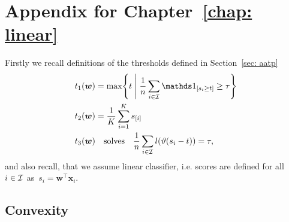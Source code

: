 \chapter{Appendix for Chapter~\ref{chap: linear}}

Firstly we recall definitions of the thresholds defined in Section~\ref{sec: aatp}
\begin{equation*}
  \begin{aligned}
    t_1(\bm{w}) & = \max \Set{t}{\frac{1}{n} \sum_{i \in \I} \Iverson{s_i \ge t} \ge \tau} \\
    t_2(\bm{w}) & = \frac{1}{K} \sum_{i=1}^{K} s_{[i]} \\
    t_3(\bm{w}) & \quad \text{solves} \quad \frac{1}{n} \sum_{i \in \I} l\Brac{\vartheta(s_i - t)} = \tau, \\
  \end{aligned}
\end{equation*}
and also recall, that we assume linear classifier, i.e. scores are defined for all~$i \in \mathcal{I}$ as~$s_i = \bm{w}^{\top} \bm{x}_i.$

\section{Convexity}

